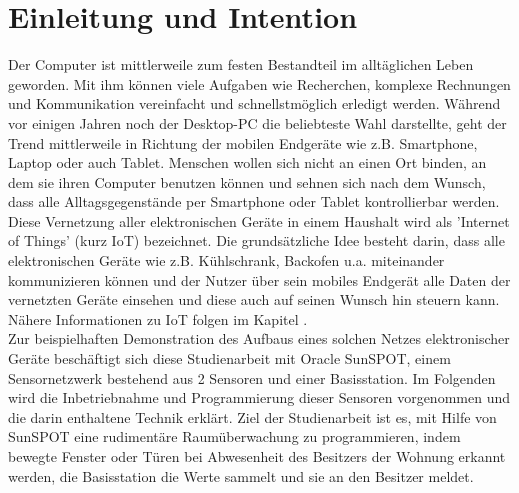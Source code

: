 \chapter{Einleitung und Intention}\label{c:Einleitung} %

Der Computer ist mittlerweile zum festen Bestandteil im alltäglichen Leben geworden. Mit ihm können viele Aufgaben wie Recherchen, komplexe Rechnungen und Kommunikation vereinfacht und schnellstmöglich erledigt werden. Während vor einigen Jahren noch der Desktop-PC die beliebteste Wahl darstellte, geht der Trend mittlerweile in Richtung der mobilen Endgeräte wie z.B. Smartphone, Laptop oder auch Tablet. Menschen wollen sich nicht an einen Ort binden, an dem sie ihren Computer benutzen können und sehnen sich nach dem Wunsch, dass alle Alltagsgegenstände per Smartphone oder Tablet kontrollierbar werden.\\

Diese Vernetzung aller elektronischen Geräte in einem Haushalt wird als 'Internet of Things' (kurz IoT) bezeichnet. Die grundsätzliche Idee besteht darin, dass alle elektronischen Geräte wie z.B. Kühlschrank, Backofen u.a. miteinander kommunizieren können und der Nutzer über sein mobiles Endgerät alle Daten der vernetzten Geräte einsehen und diese auch auf seinen Wunsch hin steuern kann. Nähere Informationen zu IoT folgen im Kapitel .\\

Zur beispielhaften Demonstration des Aufbaus eines solchen Netzes elektronischer Geräte beschäftigt sich diese Studienarbeit mit Oracle SunSPOT, einem Sensornetzwerk bestehend aus 2 Sensoren und einer Basisstation. Im Folgenden wird die Inbetriebnahme und Programmierung dieser Sensoren vorgenommen und die darin enthaltene Technik erklärt. Ziel der Studienarbeit ist es, mit Hilfe von SunSPOT eine rudiment\"are Raum\"uberwachung zu programmieren, indem bewegte Fenster oder Türen bei Abwesenheit des Besitzers der Wohnung erkannt werden, die Basisstation die Werte sammelt und sie an den Besitzer meldet.

